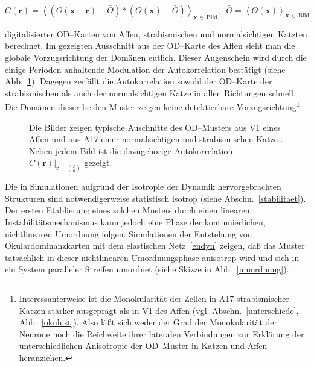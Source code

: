 \begin{small}
    \begin{equation}
        C(\mathbf{r})=\left<\left(O(\mathbf{x+r})-\bar{O}\right)\ast\left(O(\mathbf{x})-\bar{O}\right)\right>_{\mathbf{x}\,\in\,\text{Bild}},\;\;\bar{O}=\left<O(\mathbf{x})\right>_{\mathbf{x}\,\in\,\text{Bild}}
        \label{autocorr}
    \end{equation}
\end{small}

\noindent digitalisierter OD--Karten von Affen, strabismischen und
normalsichtigen Katzten berechnet. Im gezeigten Ausschnitt aus der
OD--Karte des Affen sieht man die globale Vorzugsrichtung der Domänen
eutlich. Dieser Augenschein wird durch die einige Perioden anhaltende
Modulation der Autokorrelation bestätigt (siehe Abb.~\ref{odcorr}).
Dagegen zerfällt die Autokorrelation sowohl der OD--Karte der
strabismischen als auch der normalsichtigen Katze in allen Richtungen
schnell. Die Domänen dieser beiden Muster zeigen keine detektierbare
Vorzugsrichtung\footnote{Interessanterweise ist die Monokularität der
Zellen in A17 strabismischer Katzen stärker ausgeprägt als in V1 des
Affen (vgl. Abschn.~\ref{unterschiede}, Abb.~\ref{okuhist}). Also läßt
sich weder der Grad der Monokularität der Neurone noch die Reichweite
ihrer lateralen Verbindungen zur Erklärung der unterschiedlichen
Anisotropie der OD--Muster in Katzen und Affen heranziehen.}.

\begin{figure}[ht!]
    \centering
    \caption{Die Bilder zeigen typische Auschnitte des OD--Musters aus V1 eines
    Affen \parencite[6.4mm$\times$4.3mm, optisches
    Ableiten,][]{grinvald:1991} und aus A17 einer normalsichtigen und strabismischen Katze
        \parencite[{jeweils 5mm$\times$3mm, [$^3$H]--Prolin
        Markierung,}][]{loewel:1987}. Neben jedem Bild ist die dazugehörige Autokorrelation
        $C(\mathbf{r})\vert_{\mathbf{r}={\binom{x}{0}}}$ gezeigt.}
    \label{odcorr}
\end{figure}

Die in Simulationen aufgrund der Isotropie der Dynamik
hervorgebrachten Strukturen sind notwendigerweise statistisch isotrop
(siehe Abschn.~\ref{stabilitaet}). Der ersten Etablierung eines solchen
Musters durch einen linearen Instabilitätsmechanismus kann jedoch
eine Phase der kontinuierlichen, nichtlinearen Umordnung folgen. Simulationen der Entstehung von Okulardominanzkarten mit
dem elastischen Netz~\eqref{endyn} zeigen, daß das Muster tatsächlich in
dieser nichtlinearen Umordnungsphase anisotrop wird und sich in ein System
paralleler Streifen umordnet (siehe Skizze in
Abb.~\ref{umordnung}).

